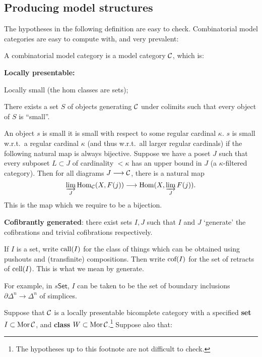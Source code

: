\documentclass[11pt]{article}
\begin{document}
\begin{JeremyModelCategories}
\subsection*{Producing model structures}
The hypotheses in the following definition are easy to check. Combinatorial model categories are easy to compute with, and very prevalent:
\begin{defn*}
A combinatorial model category is a model category $\mathcal{C}$, which is:
\begin{enumerate}\squishlist
\item \textbf{Locally presentable:} 
\begin{itemise}
\item Locally small (the hom classes are sets);
\item There exists a set $S$ of objects generating $\mathcal{C}$ under colimits such that every object of $S$ is ``small''. 
\begin{itemise}
\item An object $s$ is small \Iff it is small with respect to some regular cardinal $\kappa$. $s$ is small w.r.t.\ a regular cardinal $\kappa$ (and thus w.r.t.\ all larger regular cardinals) if the following natural map is always bijective.
Suppose we have a poset $J$ such that every subposet $L\subset J$ of cardinality $<\kappa$ has an upper bound in $J$ (a $\kappa$-filtered category). Then for all diagrams $J\longrightarrow \mathcal{C}$, there is a natural map 
\[\varinjlim_J \operatorname{Hom}_{\mathcal{C}}(X,F(j))\longrightarrow\operatorname{Hom}(X,\varinjlim_J F(j)).\]
This is the map which we require to be a bijection.
\end{itemise}
\end{itemise}
\item \textbf{Cofibrantly generated}: there exist sets $I,J$ such that $I$ and $J$ `generate' the cofibrations and trivial cofibrations respectively.
\begin{itemise}
\item If $I$ is a set, write $\textup{call}(I)$ for the class of things which can be obtained using pushouts and (transfinite) compositions. Then write $\textup{cof}(I)$ for the set of retracts of $\textup{cell}(I)$. This is what we mean by generate.
\end{itemise}
For example, in $s\mathsf{Set}$, $I$ can be taken to be the set of boundary inclusions $\partial\Delta^n\to \Delta^n$ of simplices.
\end{enumerate}
\end{defn*}
\begin{thm*}
Suppose that $\mathcal{C}$ is a locally presentable bicomplete category with a specified \textbf{set} $I\subset\operatorname{Mor}\mathcal{C}$, and \textbf{class} $W\subset\operatorname{Mor}\mathcal{C}$.\footnote{The hypotheses up to this footnote are not difficult to check.} Suppose also that:

\end{thm*}
\end{JeremyModelCategories}
\end{document}

